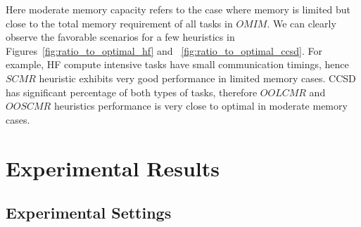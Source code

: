 \documentclass[sigconf]{acmart}
\begin{document}
{		Here moderate memory capacity refers to the case where memory is limited but close to the total memory requirement of all tasks in $OMIM$. We can clearly observe the favorable scenarios for a few heuristics in Figures~\ref{fig:ratio_to_optimal_hf} and ~\ref{fig:ratio_to_optimal_ccsd}. For example, HF compute intensive tasks have small communication timings, hence $SCMR$ heuristic exhibits very good performance in limited memory cases. CCSD has significant percentage of both types of tasks, therefore $OOLCMR$ and $OOSCMR$ heuristics performance is very close to optimal in moderate memory cases. 
		
		\section{Experimental Results}
		\label{sec:exp}
		
		\subsection{Experimental Settings}
		
}
\end{document}
